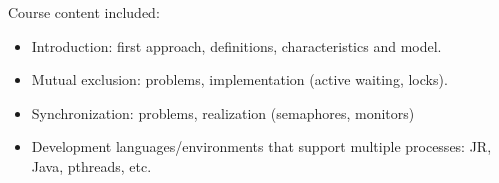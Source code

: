 Course content included:
\begin{itemize}
    \item Introduction: first approach, definitions, characteristics and model.
    \item Mutual exclusion: problems, implementation (active waiting, locks).
    \item Synchronization: problems, realization (semaphores, monitors)
    \item Development languages/environments that support multiple processes: JR, Java, pthreads, etc.
\end{itemize}
